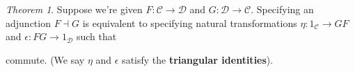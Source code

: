 \documentclass[a4paper]{article}
\theoremstyle{definition}
\theoremstyle{remark}
\theoremstyle{default}
\newtheorem{theorem}[definition]{Theorem}
\numberwithin{definition}{section}
\begin{document}
\begin{theorem}
	Suppose we're given $F: \mathcal{C} \to \mathcal{D}$ and $G: \mathcal{D} \to \mathcal{C}$.
	Specifying an adjunction $F \dashv G$ is equivalent to specifying natural transformations
	$\eta: 1_\mathcal{C} \to GF$ and $\epsilon: FG \to 1_\mathcal{D}$ such that
	\begin{center}
	\end{center}
	commute.
	(We say $\eta$ and $\epsilon$ satisfy the \textbf{triangular identities}).
\end{theorem}
\end{document}
